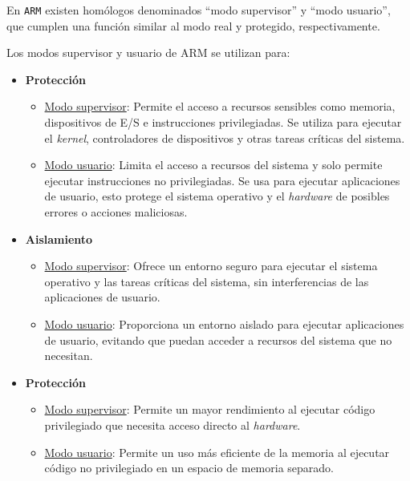 	
	
	En \texttt{ARM} existen homólogos denominados ``modo supervisor'' y ``modo usuario'', que cumplen una función similar al modo real y protegido, respectivamente.
	
	
	Los modos supervisor y usuario de ARM se utilizan para:
	\begin{itemize} \setlength\itemsep{0pt}
		\item \textbf{Protección}
		\begin{itemize} \setlength\itemsep{0pt}
			\item \underline{Modo supervisor}: Permite el acceso a recursos sensibles como memoria, dispositivos de E/S e instrucciones privilegiadas. Se utiliza para ejecutar el \textit{kernel}, controladores de dispositivos y otras tareas críticas del sistema.
			
			\item \underline{Modo usuario}: Limita el acceso a recursos del sistema y solo permite ejecutar instrucciones no privilegiadas. Se usa para ejecutar aplicaciones de usuario, esto protege el sistema operativo y el \textit{hardware} de posibles errores o acciones maliciosas.
		\end{itemize}
	
		\item \textbf{Aislamiento}
		\begin{itemize} \setlength\itemsep{0pt}
			\item \underline{Modo supervisor}: Ofrece un entorno seguro para ejecutar el sistema operativo y las tareas críticas del sistema, sin interferencias de las aplicaciones de usuario.
			
			\item \underline{Modo usuario}: Proporciona un entorno aislado para ejecutar aplicaciones de usuario, evitando que puedan acceder a recursos del sistema que no necesitan.
		\end{itemize}
	
		\item \textbf{Protección}
		\begin{itemize} \setlength\itemsep{0pt}
			\item \underline{Modo supervisor}: Permite un mayor rendimiento al ejecutar código privilegiado que necesita acceso directo al \textit{hardware}.
			
			\item \underline{Modo usuario}: Permite un uso más eficiente de la memoria al ejecutar código no privilegiado en un espacio de memoria separado.
		\end{itemize}
	\end{itemize}

